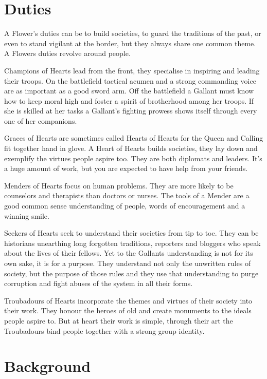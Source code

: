 \section*{Duties}

A Flower's duties can be to build societies, to guard the traditions of the past, or even to stand vigilant at the border, but they always share one common theme. A Flowers duties revolve around people. 

Champions of Hearts lead from the front, they specialise in inspiring and leading their troops. On the battlefield tactical acumen and a strong commanding voice are as important as a good sword arm. Off the battlefield a Gallant must know how to keep moral high and foster a spirit of brotherhood among her troops. If she is skilled at her tasks a Gallant's fighting prowess shows itself through every one of her companions. 

Graces of Hearts are sometimes called Hearts of Hearts for the Queen and Calling fit together hand in glove. A Heart of Hearts builds societies, they lay down and exemplify the virtues people aspire too. They are both diplomats and leaders. It's a huge amount of work, but you are expected to have help from your friends. 

Menders of Hearts focus on human problems. They are more likely to be counselors and therapists than doctors or nurses. The tools of a Mender are a good common sense understanding of people, words of encouragement and a winning smile. 

Seekers of Hearts seek to understand their societies from tip to toe. They can be historians unearthing long forgotten traditions, reporters and bloggers who speak about the lives of their fellows. Yet to the Gallants understanding is not for its own sake, it is for a purpose. They understand not only the unwritten rules of society, but the purpose of those rules and they use that understanding to purge corruption and fight abuses of the system in all their forms. 

Troubadours of Hearts incorporate the themes and virtues of their society into their work. They honour the heroes of old and create monuments to the ideals people aspire to. But at heart their work is simple, through their art the Troubadours bind people together with a strong group identity. 

\section*{Background}

